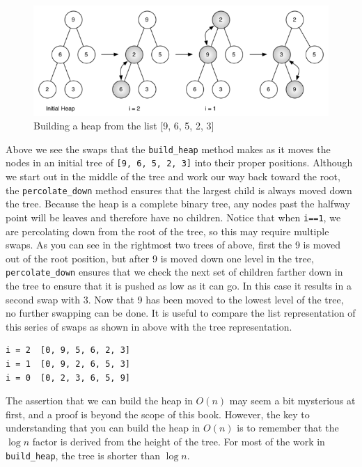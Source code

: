 \documentclass[11pt]{article}
\makeatletter
\newcommand{\boxspacing}{\kern\kvtcb@left@rule\kern\kvtcb@boxsep}
\newcommand{\prompt}[4]{
        \ttfamily\llap{{\color{#2}[#3]:\hspace{3pt}#4}}\vspace{-\baselineskip}
    }
\makeatother
\begin{document}
    \begin{figure}
\centering
\includegraphics{figures/build-heap.png}
\caption{Building a heap from the list {[}9, 6, 5, 2, 3{]}}
\end{figure}

Above we see the swaps that the \texttt{build\_heap} method makes as it
moves the nodes in an initial tree of \texttt{{[}9,\ 6,\ 5,\ 2,\ 3{]}}
into their proper positions. Although we start out in the middle of the
tree and work our way back toward the root, the \texttt{percolate\_down}
method ensures that the largest child is always moved down the tree.
Because the heap is a complete binary tree, any nodes past the halfway
point will be leaves and therefore have no children. Notice that when
\texttt{i==1}, we are percolating down from the root of the tree, so
this may require multiple swaps. As you can see in the rightmost two
trees of above, first the 9 is moved out of the root position, but after
9 is moved down one level in the tree, \texttt{percolate\_down} ensures
that we check the next set of children farther down in the tree to
ensure that it is pushed as low as it can go. In this case it results in
a second swap with 3. Now that 9 has been moved to the lowest level of
the tree, no further swapping can be done. It is useful to compare the
list representation of this series of swaps as shown in above with the
tree representation.

\begin{verbatim}
i = 2  [0, 9, 5, 6, 2, 3]
i = 1  [0, 9, 2, 6, 5, 3]
i = 0  [0, 2, 3, 6, 5, 9]
\end{verbatim}

The assertion that we can build the heap in \(O(n)\) may seem a bit
mysterious at first, and a proof is beyond the scope of this book.
However, the key to understanding that you can build the heap in
\(O(n)\) is to remember that the \(\log{n}\) factor is derived from the
height of the tree. For most of the work in \texttt{build\_heap}, the
tree is shorter than \(\log{n}\).

    \begin{tcolorbox}[breakable, size=fbox, boxrule=1pt, pad at break*=1mm,colback=cellbackground, colframe=cellborder]
\prompt{In}{incolor}{ }{\boxspacing}
\begin{Verbatim}[commandchars=\\\{\}]

\end{Verbatim}
\end{tcolorbox}


    
    
    
\end{document}
